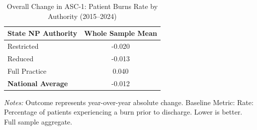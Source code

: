 \begin{table}[htbp]
    \centering
    \caption{Overall Change in ASC-1: Patient Burns Rate by Authority (2015--2024)}
    \label{tab:d_asc_rate_1_full}
    \vspace{0.2cm}
    \begin{tabular}{lc}
        \toprule
        \textbf{State NP Authority} & \textbf{Whole Sample Mean} \\
        \midrule
        Restricted & -0.020 \\
        Reduced & -0.013 \\
        Full Practice & 0.040 \\
        \midrule
        \textbf{National Average} & -0.012 \\
        \bottomrule
    \end{tabular}
    \vspace{0.1cm}
    \begin{minipage}{0.6\textwidth}
        \footnotesize \textit{Notes:} Outcome represents year-over-year absolute change. Baseline Metric: Rate: Percentage of patients experiencing a burn prior to discharge. Lower is better. Full sample aggregate.
    \end{minipage}
\end{table}